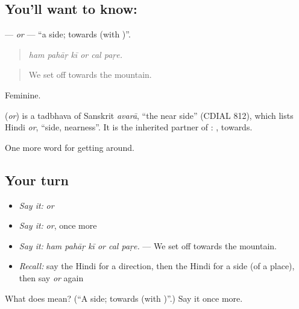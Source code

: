 \subsection*{You'll want to know: }
\textbf{} — \emph{or} — \textquotedblleft{}a side; towards (with )\textquotedblright{}.

\begin{quote}
     
\end{quote}

\begin{quote}
\emph{ham pahāṛ kī or cal paṛe.}
\end{quote}

\begin{quote}
We set off towards the mountain.
\end{quote}

Feminine.

\begin{cousinweb}
\textbf{} (\emph{or}) is a tadbhava of Sanskrit \emph{avarā}, \textquotedblleft{}the near side\textquotedblright{} (CDIAL 812), which lists Hindi \emph{or}, \textquotedblleft{}side, nearness\textquotedblright{}. It is the inherited partner of :  , towards.
\end{cousinweb}

\begin{grammarlens}[title={What you've built}]
One more word for getting around.
\end{grammarlens}

\subsection*{Your turn}
\begin{itemize}
\raggedright
  \item \emph{Say it:} \emph{or}
  \item \emph{Say it:} \emph{or}, once more
  \item \emph{Say it:} \emph{ham pahāṛ kī or cal paṛe.} — We set off towards the mountain.
  \item \emph{Recall:} say the Hindi for a direction, then the Hindi for a side (of a place), then say \emph{or} again
\end{itemize}

\begin{tcolorbox}[breakable,colback=teal!4,colframe=teal!35!black,title={Before you move on}]
What does  mean? (\textquotedblleft{}A side; towards (with )\textquotedblright{}.) Say it once more.
\end{tcolorbox}
